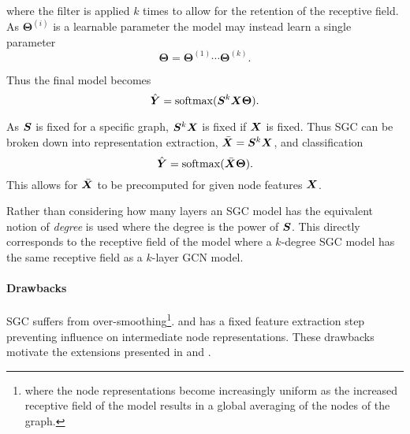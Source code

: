 where the filter is applied $k$ times to allow for the retention of the receptive field.
As $\bm{\Theta}^{(i)}$ is a learnable parameter the model may instead learn a single parameter
\begin{equation}
    \label{eq:theta}
    \bm{\Theta} = \bm{\Theta}^{(1)}\cdots\bm{\Theta}^{(k)}.
\end{equation}

Thus the final model becomes
\begin{equation}
    \hat{{\bm{Y}}} = \operatorname{softmax}({\bm{S}}^{k}{\bm{X}}\bm{\Theta}).
\end{equation}

As ${\bm{S}}$ is fixed for a specific graph, ${\bm{S}}^k{\bm{X}}$ is fixed if ${\bm{X}}$ is fixed.
Thus SGC can be broken down into representation extraction, $\bar{{\bm{X}}} = {\bm{S}}^k{\bm{X}}$, and classification
\begin{equation}
    \label{eq:SGC}
    \hat{{\bm{Y}}} = \operatorname{softmax}(\bar{{\bm{X}}}\bm{\Theta}).
\end{equation}
This allows for $\bar{{\bm{X}}}$ to be precomputed for given node features ${\bm{X}}$.

Rather than considering how many layers an SGC model has the equivalent notion of \emph{degree} is used where the degree is the power of ${\bm{S}}$.
This directly corresponds to the receptive field of the model where a $k$-degree SGC model has the same receptive field as a $k$-layer GCN model.

\paragraph{Drawbacks}
SGC suffers from over-smoothing\footnote{where the node representations become increasingly uniform as the increased receptive field of the model results in a global averaging of the nodes of the graph.}.
and has a fixed feature extraction step preventing influence on intermediate node representations.
These drawbacks motivate the extensions presented in  and .


